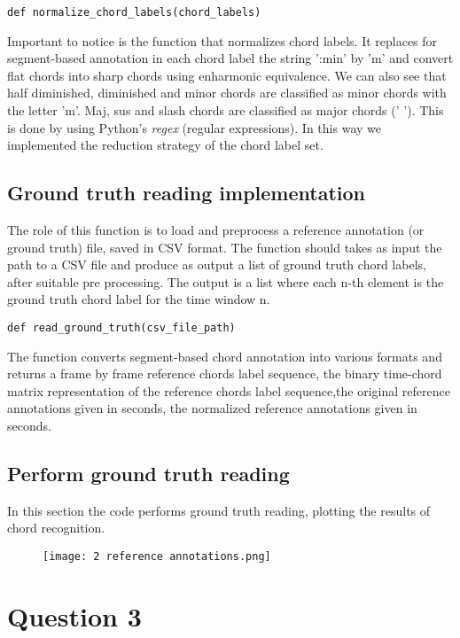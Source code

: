 \documentclass{article}
\begin{document}
\begin{lstlisting}
def normalize_chord_labels(chord_labels)
\end{lstlisting}

Important to notice is the function that normalizes chord labels.
It replaces for segment-based annotation in each chord label the string ':min' by 'm' and convert flat chords into sharp chords using enharmonic equivalence. We can also see that half diminished, diminished and minor chords are classified as minor chords with the letter 'm'. Maj, sus and slash  chords are classified as major chords (' '). This is done by using Python's \textit{regex} (regular expressions). In this way we implemented the reduction strategy of the chord label set.


\subsection{Ground truth reading implementation}
The role of this function is to load and preprocess a reference annotation (or ground truth) file, saved in CSV format. The function should takes as input the path to a CSV file and produce as output a list of ground truth chord labels, after suitable pre processing. The output is a list where each n-th element is the ground truth chord label for the time window n. 

\begin{lstlisting}
def read_ground_truth(csv_file_path)
\end{lstlisting}

The function converts segment-based chord annotation into various formats and returns a frame by frame reference chords label sequence, the binary time-chord matrix representation of the reference chords label sequence,the original reference annotations given in seconds, the normalized reference annotations given in seconds.


\subsection{Perform ground truth reading}
In this section the code performs ground truth reading, plotting the results of chord recognition.

\begin{figure} [H]
 \centering
 \texttt{[image: 2 reference annotations.png]}
\end{figure}

\section{Question 3}
\end{document}

